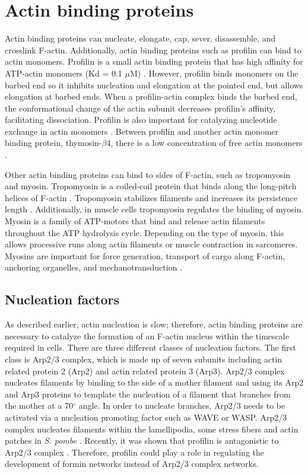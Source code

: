 \section{Actin binding proteins}\label{abps} 
Actin binding proteins can nucleate, elongate, cap, sever, disassemble, and crosslink F-actin. Additionally, actin binding proteins such as profilin can bind to actin monomers. Profilin is a small actin binding protein that has high affinity for ATP-actin monomers (Kd = 0.1 $\mu$M) \citep{pollard_actin_2016}. However, profilin binds monomers on the barbed end so it inhibits nucleation and elongation at the pointed end, but allows elongation at barbed ends. When a profilin-actin complex binds the barbed end, the conformational change of the actin subunit decreases profilin's affinity, facilitating dissociation. Profilin is also important for catalyzing nucleotide exchange in actin monomers \citep{mockrin_acanthamoeba_1980, vinson_interactions_1998}. Between profilin and another actin monomer binding protein, thymosin-$\beta$4, there is a low concentration of free actin monomers \citep{pollard_actin_2016}.

Other actin binding proteins can bind to sides of F-actin, such as tropomyosin and myosin. Tropomyosin is a coiled-coil protein that binds along the long-pitch helices of F-actin \citep{ecken_structure_2015}. Tropomyosin stabilizes filaments and increases its persistence length \citep{sousa_electron_2010}. Additionally, in muscle cells tropomyosin regulates the binding of myosin. Myosin is a family of ATP-motors that bind and release actin filaments throughout the ATP hydrolysis cycle. Depending on the type of myosin, this allows processive runs along actin filaments or muscle contraction in sarcomeres. Myosins are important for force generation, transport of cargo along F-actin, anchoring organelles, and mechanotransduction \citep{hartman_myosin_2012}.

\subsection{Nucleation factors}\label{nucleators}
As described earlier, actin nucleation is slow; therefore, actin binding proteins are necessary to catalyze the formation of an F-actin nucleus within the timescale required in cells. There are three different classes of nucleation factors. The first class is Arp2/3 complex, which is made up of seven subunits including actin related protein 2 (Arp2) and actin related protein 3 (Arp3). Arp2/3 complex nucleates filaments by binding to the side of a mother filament and using its Arp2 and Arp3 proteins to template the nucleation of a filament that branches from the mother at a 70$^{\circ}$ angle. In order to nucleate branches, Arp2/3 needs to be activated via a nucleation promoting factor such as WAVE or WASP. Arp2/3 complex nucleates filaments within the lamellipodia, some stress fibers and actin patches in \textit{S. pombe} \citep{pollard_actin_2016, naumanen_mechanisms_2008, mishra_yeast_2014}. Recently, it was shown that profilin is antagonistic to Arp2/3 complex \citep{suarez_profilin_2015,rotty_profilin-1_2015}. Therefore, profilin could play a role in regulating the development of formin networks instead of Arp2/3 complex networks. 

